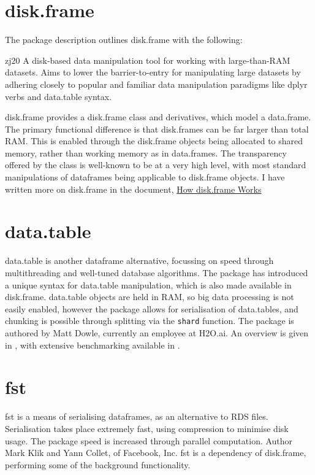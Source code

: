 \documentclass[10pt,a4paper]{article}
\begin{document}
\section{disk.frame}
\label{sec:disk.frame}

The package description outlines disk.frame with the following:

\begin{displaycquote}{zj20}
  A disk-based data manipulation tool for working with large-than-RAM
  datasets. Aims to lower the barrier-to-entry for manipulating large
  datasets by adhering closely to popular and familiar data
  manipulation paradigms like dplyr verbs and data.table syntax.
\end{displaycquote}

disk.frame provides a disk.frame class and derivatives, which model a
data.frame. The primary functional difference is that disk.frames can
be far larger than total RAM. This is enabled through the disk.frame
objects being allocated to shared memory, rather than working memory
as in data.frames. The transparency offered by the class is well-known
to be at a very high level, with most standard manipulations of
dataframes being applicable to disk.frame objects. I have written more on disk.frame in the document, \href{how-disk.frame-works.pdf}{How disk.frame Works}

\section{data.table}
\label{sec:data.table}

data.table is another dataframe alternative, focussing on speed
through multithreading and well-tuned database
algorithms\cite{dowle19}. The package has introduced a unique syntax
for data.table manipulation, which is also made available in
disk.frame. data.table objects are held in RAM, so big data processing
is not easily enabled, however the package allows for serialisation of
data.tables, and chunking is possible through splitting via the
\texttt{shard} function. The package is authored by Matt Dowle,
currently an employee at H2O.ai. An overview is given in
\textcite{dowle19:_introd}, with extensive benchmarking available in
\textcite{dowle19:_bench}.

\section{fst}
\label{sec:fst}

fst is a means of serialising dataframes, as an alternative to RDS
files\cite{klik19}. Serialisation takes place extremely fast, using compression to
minimise disk usage. The package speed is increased through parallel
computation. Author Mark Klik and Yann Collet, of Facebook, Inc. fst
is a dependency of disk.frame, performing some of the background
functionality.
\end{document}
